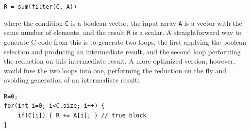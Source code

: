 \begin{small}
\begin{Verbatim}[xleftmargin=.3\columnwidth]
R = sum(filter(C, A))
\end{Verbatim}
\end{small}


\noindent{}where the condition \texttt{C} is a boolean vector, the input array \texttt{A}
is a vector with the same number of elements, and the result \texttt{R} is a
scalar.  A straightforward way to generate C code from this is to generate two loops, the first applying the boolean selection and producing an intermediate result, and the second loop performing the reduction on this intermediate result.  A more optimized version, however, would fuse the two loops into one, performing the reduction on the fly and avoiding generation of an intermediate result:


\begin{small}
\begin{Verbatim}[xleftmargin=.15\columnwidth]
R=0;
for(int i=0; i<C.size; i++) {
    if(C[i]) { R += A[i]; } // true block
}
\end{Verbatim}
\end{small}




